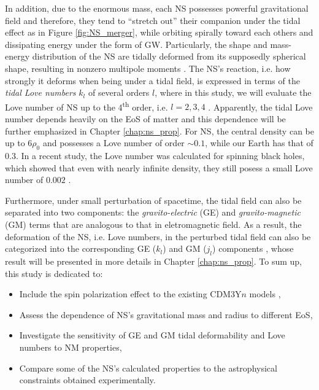 In addition, due to the enormous mass, each \gls{NS} possesses powerful gravitational field and therefore, they tend to ``stretch out'' their companion under the tidal effect as in Figure \ref{fig:NS_merger}, while orbiting spirally toward each others and dissipating energy under the form of \gls{GW}. Particularly, the shape and mass-energy distribution of the \gls{NS} are tidally deformed from its supposedly spherical shape, resulting in nonzero multipole moments \citep{hinderer2008tidal,hinderer2010tidal,damour2009relativistic}. The \gls{NS}'s reaction, i.e. how strongly it deforms when being under a tidal field, is expressed in terms of the \emph{tidal Love numbers} $k_l$ of several orders $l$, where in this study, we will evaluate the Love number of \gls{NS} up to the 4\textsuperscript{th} order, i.e. $l=2,3,4$ \citep{perot2021role}. Apparently, the tidal Love number depends heavily on the \gls{EoS} of matter and this dependence will be further emphasized in Chapter \ref{chap:ns_prop}. For \gls{NS}, the central density can be up to $6\rho_0$ and possesses a Love number of order $\sim 0.1$, while our Earth has that of $0.3$. In a recent study, the Love number was calculated for spinning black holes, which showed that even with nearly infinite density, they still posess a small Love number of $0.002$ \citep{le2021spinning}.\par
Furthermore, under small perturbation of spacetime, the tidal field can also be separated into two components: the \emph{gravito-electric} (\gls{GE}) and \emph{gravito-magnetic} (\gls{GM}) terms \citep{damour2009relativistic} that are analogous to that in eletromagnetic field. As a result, the deformation of the \gls{NS}, i.e. Love numbers, in the perturbed tidal field can also be categorized into the corresponding \gls{GE} ($k_l$) and \gls{GM} ($j_l$) components \citep{perot2021role}, whose result will be presented in more details in Chapter \ref{chap:ns_prop}. To sum up, this study is dedicated to:
\begin{itemize}
        \item Include the spin polarization effect to the existing CDM3Y$n$ models \citep{tan2021equation},
        \item Assess the dependence of \gls{NS}'s gravitational mass and radius to different \gls{EoS},
        \item Investigate the sensitivity of \gls{GE} and \gls{GM} tidal deformability and Love numbers to \gls{NM} properties,
        \item Compare some of the \gls{NS}'s calculated properties to the astrophysical constraints obtained experimentally.
\end{itemize}
